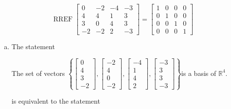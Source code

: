 \begin{exerciseAnswer} 


\[\operatorname{RREF} \left[\begin{array}{cccc}
0 & -2 & -4 & -3 \\
4 & 4 & 1 & 3 \\
3 & 0 & 4 & 3 \\
-2 & -2 & 2 & -3
\end{array}\right] = \left[\begin{array}{cccc}
1 & 0 & 0 & 0 \\
0 & 1 & 0 & 0 \\
0 & 0 & 1 & 0 \\
0 & 0 & 0 & 1
\end{array}\right] \]


\begin{enumerate}[(a)]
\item The statement 
\begin{center}\begin{minipage}{0.8\textwidth}
 The set of vectors \( \left\{ \left[\begin{array}{c}
0 \\
4 \\
3 \\
-2
\end{array}\right] , \left[\begin{array}{c}
-2 \\
4 \\
0 \\
-2
\end{array}\right] , \left[\begin{array}{c}
-4 \\
1 \\
4 \\
2
\end{array}\right] , \left[\begin{array}{c}
-3 \\
3 \\
3 \\
-3
\end{array}\right] \right\} \)is a basis of \(\mathbb{R}^4\). 
\end{minipage}\end{center}
     is equivalent to the statement 
\begin{center}\begin{minipage}{0.8\textwidth}
 The set of vectors \( \left\{ \left[\begin{array}{c}
0 \\
4 \\

\end{array}
\end{minipage}
\end{center}
\end{enumerate}
\end{exerciseAnswer}
